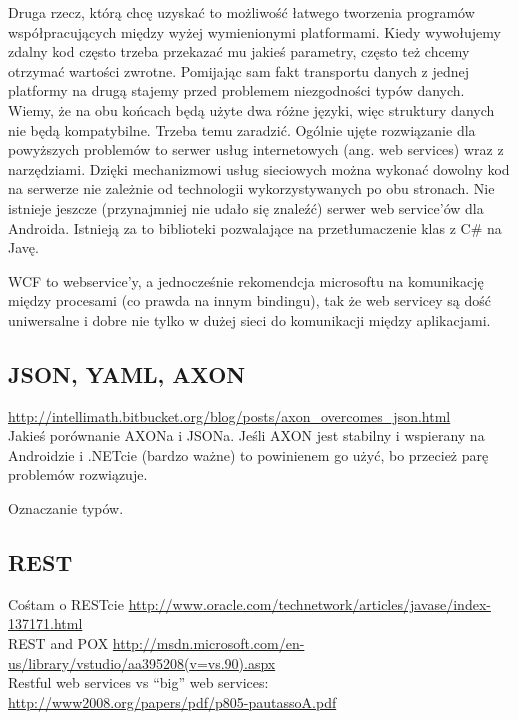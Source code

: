 Druga rzecz, którą chcę uzyskać to możliwość łatwego tworzenia programów współpracujących między wyżej wymienionymi platformami. Kiedy wywołujemy zdalny kod często trzeba przekazać mu jakieś parametry, często też chcemy otrzymać wartości zwrotne. Pomijając sam fakt transportu danych z jednej platformy na drugą stajemy przed problemem niezgodności typów danych. Wiemy, że na obu końcach będą użyte dwa różne języki, więc struktury danych nie będą kompatybilne. Trzeba temu zaradzić.
Ogólnie ujęte rozwiązanie dla powyższych problemów to serwer usług internetowych (ang. web services) wraz z narzędziami. Dzięki mechanizmowi usług sieciowych można wykonać dowolny kod na serwerze nie zależnie od technologii wykorzystywanych po obu stronach. Nie istnieje jeszcze (przynajmniej nie udało się znaleźć) serwer web service’ów dla Androida. Istnieją za to biblioteki pozwalające na przetłumaczenie klas z C\# na Javę.

WCF to webservice'y, a jednocześnie rekomendcja microsoftu na komunikację między procesami (co prawda na innym bindingu), tak że web servicey są dość uniwersalne i dobre nie tylko w dużej sieci do komunikacji między aplikacjami.

\subsection{JSON, YAML, AXON}
\url{http://intellimath.bitbucket.org/blog/posts/axon_overcomes_json.html}\\
Jakieś porównanie AXONa i JSONa. Jeśli AXON jest stabilny i wspierany na Androidzie i .NETcie (bardzo ważne) to powinienem go użyć, bo przecież parę problemów rozwiązuje.

Oznaczanie typów.

\subsection{REST}
Cośtam o RESTcie \url{http://www.oracle.com/technetwork/articles/javase/index-137171.html}\\
REST and POX \url{http://msdn.microsoft.com/en-us/library/vstudio/aa395208(v=vs.90).aspx}\\

Restful web services vs ``big'' web services: \url{http://www2008.org/papers/pdf/p805-pautassoA.pdf}\\